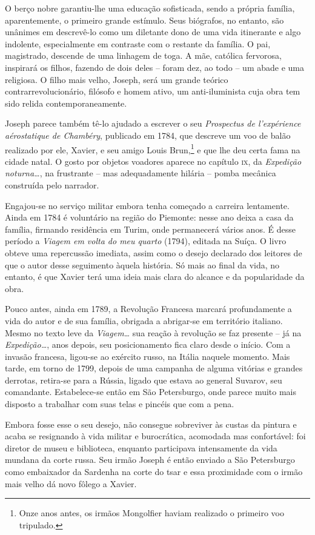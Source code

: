O berço nobre garantiu-lhe uma educação sofisticada, sendo a própria
família, aparentemente, o primeiro grande estímulo. Seus biógrafos, no
entanto, são unânimes em descrevê-lo como um diletante dono de uma
vida itinerante e algo indolente, especialmente em contraste com o
restante da família. O pai, magistrado, descende de uma linhagem de
toga. A mãe, católica fervorosa, inspirará os filhos, fazendo de dois
deles -- foram dez, ao todo -- um abade e uma religiosa. O filho mais
velho, Joseph, será um grande teórico contrarrevolucionário, filósofo e
homem ativo,  um anti-iluminista cuja obra tem sido relida
contemporaneamente. 

 Joseph parece também tê-lo ajudado a escrever o seu \textit{Prospectus
de l’expérience aérostatique de Chambéry}, publicado em 1784, que
descreve um voo de balão realizado por ele, Xavier, e seu amigo Louis
Brun,\footnote{ Onze anos antes, os irmãos Mongolfier haviam realizado o
primeiro voo tripulado.} e que lhe deu certa fama na cidade natal. O
gosto por objetos voadores aparece no capítulo \textsc{ix}, da \textit{Expedição
noturna\ldots}, na frustrante -- mas adequadamente hilária -- pomba mecânica
construída pelo narrador. 

Engajou-se no serviço militar embora tenha começado a carreira
lentamente. Ainda em 1784 é voluntário na região do Piemonte: nesse ano
deixa a casa da família, firmando residência em Turim, onde permanecerá
vários anos. É desse período a \textit{Viagem em volta do meu quarto}
(1794), editada na Suíça. O livro obteve uma repercussão imediata,
assim como o desejo declarado dos leitores de que o autor desse
seguimento àquela história. Só mais ao final da vida, no entanto, é que
Xavier terá uma ideia mais clara do alcance e da popularidade da obra. 

Pouco antes, ainda em 1789, a Revolução Francesa marcará profundamente a
vida do autor e de sua família, obrigada a abrigar-se em território
italiano. Mesmo no texto leve da \textit{Viagem\ldots} sua reação à
revolução se faz presente -- já na \textit{Expedição\ldots}, anos depois,
seu posicionamento fica claro desde o início. Com a invasão francesa,
ligou-se ao exército russo, na Itália naquele momento. Mais tarde, em
torno de 1799, depois de uma campanha de alguma vitórias e grandes
derrotas, retira-se para a Rússia, ligado que estava ao general
Suvarov, seu comandante. Estabelece-se então em São Petersburgo, onde
parece muito mais disposto a trabalhar com suas telas e pincéis que com
a pena.

Embora fosse esse o seu desejo, não consegue sobreviver às custas da
pintura e acaba se resignando à vida militar e burocrática, acomodada
mas confortável: foi diretor de museu e biblioteca, enquanto
participava intensamente da vida mundana da corte russa. Seu irmão
Joseph é então enviado a São Petersburgo como embaixador da Sardenha na
corte do tsar e essa proximidade com o irmão mais velho dá novo fôlego
a Xavier. 

